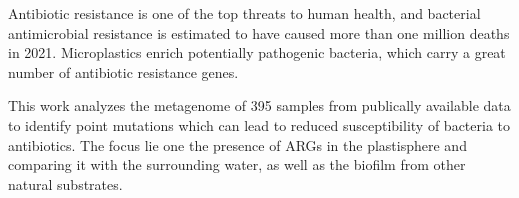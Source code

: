% 
Antibiotic resistance is one of the top threats to human health, and bacterial antimicrobial resistance is estimated to have caused more than one million deaths in 2021. 
Microplastics enrich potentially pathogenic bacteria, which carry a great number of antibiotic resistance genes. 

This work analyzes the metagenome of 395 samples from publically available data to identify point mutations which can lead to reduced susceptibility of bacteria to antibiotics. The focus lie one the presence of ARGs in the plastisphere and comparing it with the surrounding water, as well as the biofilm from other natural substrates. 

